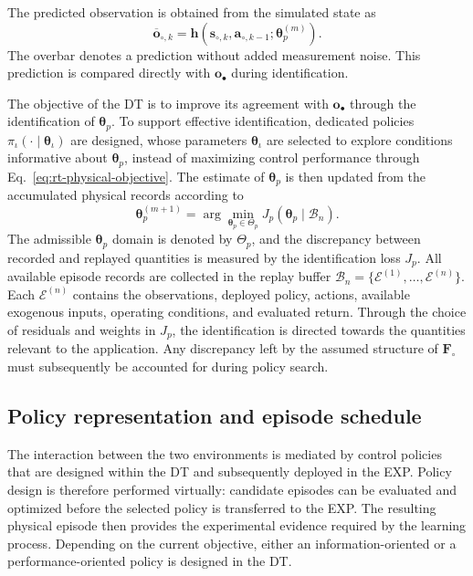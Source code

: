 \documentclass[journal]{IEEEtran}
\begin{document}
The predicted observation is obtained from the simulated state as
\begin{equation}
 \overline{\mathbf o}_{\circ,k}
 =\mathbf h(\mathbf s_{\circ,k},\mathbf a_{\circ,k-1};
            \boldsymbol{\theta}_p^{(m)}).
 \label{eq:rt-digital-observation}
\end{equation}
The overbar denotes a prediction without added measurement noise. This prediction is compared directly with $\mathbf o_\bullet$ during identification.

The objective of the DT is to improve its agreement with $\mathbf o_\bullet$ through the identification of $\boldsymbol{\theta}_p$. To support effective identification, dedicated policies $\pi_\iota(\cdot\mid\boldsymbol{\theta}_\iota)$ are designed, whose parameters $\boldsymbol{\theta}_\iota$ are selected to explore conditions informative about $\boldsymbol{\theta}_p$, instead of maximizing control performance through Eq.~\eqref{eq:rt-physical-objective}. The estimate of $\boldsymbol{\theta}_p$ is then updated from the accumulated physical records according to
\begin{equation}
\boldsymbol{\theta}_p^{(m+1)}
 =\arg\min_{\boldsymbol{\theta}_p\in\Theta_p}
 J_p(\boldsymbol{\theta}_p\mid\mathcal B_n).
 \label{eq:rt-model-objective}
\end{equation}
The admissible $\boldsymbol{\theta}_p$ domain is denoted by $\Theta_p$, and the discrepancy between recorded and replayed quantities is measured by the identification loss $J_p$. All available episode records are collected in the replay buffer $\mathcal B_n=\{\mathcal E^{(1)},\ldots,\mathcal E^{(n)}\}$. Each $\mathcal E^{(n)}$ contains the observations, deployed policy, actions, available exogenous inputs, operating conditions, and evaluated return. Through the choice of residuals and weights in $J_p$, the identification is directed towards the quantities relevant to the application. Any discrepancy left by the assumed structure of $\mathbf F_\circ$ must subsequently be accounted for during policy search.

\subsection{Policy representation and episode schedule}
The interaction between the two environments is mediated by control policies that are designed within the DT and subsequently deployed in the EXP. Policy design is therefore performed virtually: candidate episodes can be evaluated and optimized before the selected policy is transferred to the EXP. The resulting physical episode then provides the experimental evidence required by the learning process. Depending on the current objective, either an information-oriented or a performance-oriented policy is designed in the DT.
\end{document}
